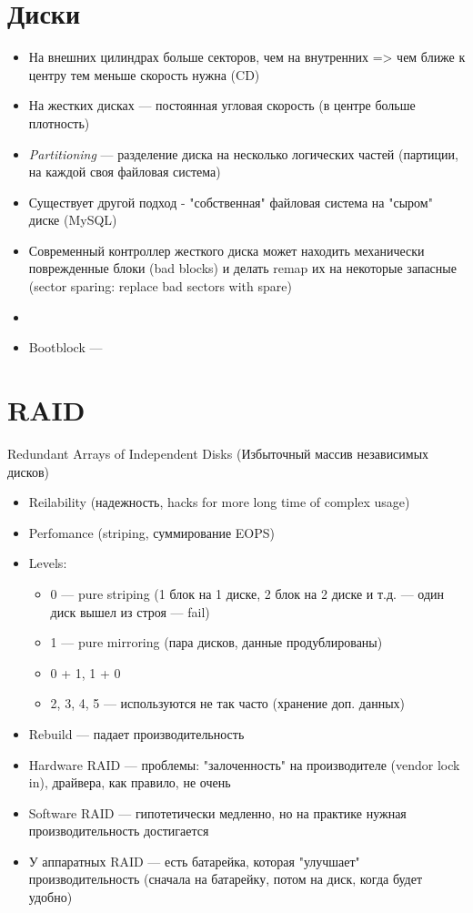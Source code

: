 \documentclass[../../lectures.tex]{subfiles}
\begin{document}
\section{Диски}
\begin{itemize}
    \item На внешних цилиндрах больше секторов, чем на внутренних 
          => чем ближе к центру тем меньше скорость нужна (CD)
    \item На жестких дисках --- постоянная угловая скорость 
          (в центре больше плотность)
    \item \emph{Partitioning} --- разделение диска на несколько 
          логических частей (партиции, на каждой своя файловая система)
    \item Существует другой подход - "собственная" файловая система 
          на "сыром" диске (MySQL)
    \item Современный контроллер жесткого диска может находить механически поврежденные блоки (bad blocks) и делать remap их на некоторые запасные (sector sparing: replace bad sectors with spare)
    \item {}
    \item Bootblock --- \todo{}
\end{itemize}

\section{RAID}
Redundant Arrays of Independent Disks (Избыточный массив независимых дисков)
\begin{itemize}
    \item Reilability (надежность, hacks for more long time of complex usage)
    \item Perfomance (striping, суммирование EOPS)
    \item Levels:
        \begin{itemize}
            \item 0 --- pure striping (1 блок на 1 диске, 2 блок на 2 диске и т.д. --- один диск вышел из строя --- fail)
            \item 1 --- pure mirroring (пара дисков, данные продублированы)
            \item 0 + 1, 1 + 0
            \item 2, 3, 4, 5 --- используются не так часто (хранение доп. данных)
        \end{itemize}
    \item Rebuild --- падает производительность
    \item Hardware RAID --- проблемы: "залоченность" на производителе (vendor lock in), драйвера, как правило, не очень
    \item Software RAID --- гипотетически медленно, но на практике нужная производительность достигается
    \item У аппаратных RAID --- есть батарейка, которая "улучшает" производительность 
          (сначала на батарейку, потом на диск, когда будет удобно)
\end{itemize}
\end{document}
